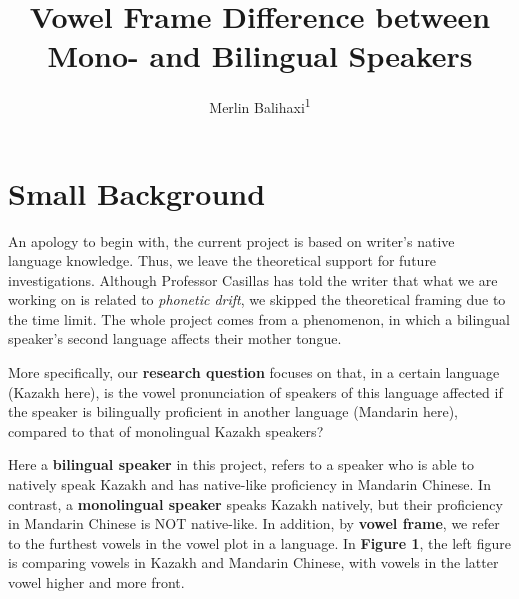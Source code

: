 \documentclass[
  man,floatsintext]{apa6}
\title{Vowel Frame Difference between Mono- and Bilingual Speakers}
\author{Merlin Balihaxi\textsuperscript{1}}
\date{}
\affiliation{\vspace{0.5cm}\textsuperscript{1} Linguistics Department, Rutgers University}
\begin{document}
\maketitle

\section{Small Background}\label{small-background}

An apology to begin with, the current project is based on writer's native language knowledge. Thus, we leave the theoretical support for future investigations. Although Professor Casillas has told the writer that what we are working on is related to \emph{phonetic drift}, we skipped the theoretical framing due to the time limit. The whole project comes from a phenomenon, in which a bilingual speaker's second language affects their mother tongue.

More specifically, our \textbf{research question} focuses on that, in a certain language (Kazakh here), is the vowel pronunciation of speakers of this language affected if the speaker is bilingually proficient in another language (Mandarin here), compared to that of monolingual Kazakh speakers?

Here a \textbf{bilingual speaker} in this project, refers to a speaker who is able to natively speak Kazakh and has native-like proficiency in Mandarin Chinese. In contrast, a \textbf{monolingual speaker} speaks Kazakh natively, but their proficiency in Mandarin Chinese is NOT native-like. In addition, by \textbf{vowel frame}, we refer to the furthest vowels in the vowel plot in a language. In \textbf{Figure 1}, the left figure is comparing vowels in Kazakh and Mandarin Chinese, with vowels in the latter vowel higher and more front.
\end{document}
